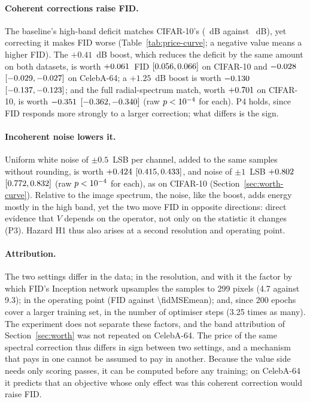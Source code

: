 \paragraph{Coherent corrections raise FID\@.} The baseline's high-band deficit
matches CIFAR-10's (\celebaDeficitHigh~dB against ~dB), yet
correcting it makes FID worse (Table~\ref{tab:price-curve}; a negative value
means a higher FID). The $+0.41$~dB boost, which reduces the deficit by the
same amount on both datasets, is worth $+0.061$~FID
$[0.056, 0.066]$ on CIFAR-10 and
$-0.028$ $[-0.029, -0.027]$ on
CelebA-64; a $+1.25$~dB boost is worth $-0.130$
$[-0.137, -0.123]$; and the full
radial-spectrum match, worth $+0.701$ on CIFAR-10, is worth
$-0.351$ $[-0.362, -0.340]$ (raw
$p <10^{-4}$ for each). P4 holds, since FID responds more strongly
to a larger correction; what differs is the sign.

\paragraph{Incoherent noise lowers it.} Uniform white noise of $\pm0.5$~LSB
per channel, added to the same samples without rounding, is worth
$+0.424$ $[0.415, 0.433]$,
and noise of $\pm1$~LSB $+0.802$
$[0.772, 0.832]$ (raw
$p <10^{-4}$ for each), as on CIFAR-10
(Section~\ref{sec:worth-curve}). Relative to the image spectrum, the noise,
like the boost, adds energy mostly in the high band, yet the two move FID in
opposite directions: direct evidence that $V$ depends on the operator, not
only on the statistic it changes (P3). Hazard H1 thus also arises at a second
resolution and operating point.

\paragraph{Attribution.} The two settings differ in the data; in the
resolution, and with it the factor by which FID's Inception network upsamples
the samples to 299 pixels (4.7 against 9.3); in the operating point (FID
\celebaFIDMSEmean{} against
\num[round-mode=places,round-precision=2]{\fidMSEmean}); and, since 200
epochs cover a larger training set, in the number of optimiser steps (3.25
times as many). The experiment does not separate these factors, and the
band attribution of Section~\ref{sec:worth} was not repeated on CelebA-64.
The price of the same spectral correction thus differs in sign between two
settings, and a mechanism that pays in one cannot be assumed to pay in
another. Because the value side needs only scoring passes, it can be computed
before any training; on CelebA-64 it predicts that an objective whose only
effect was this coherent correction would raise FID.
